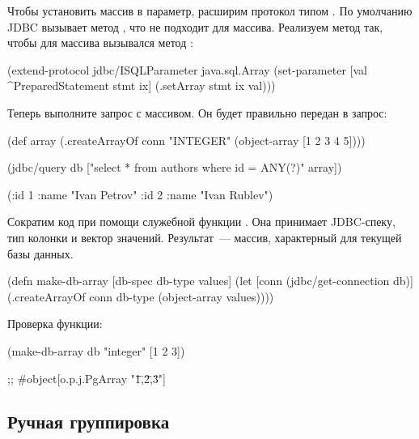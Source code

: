 Чтобы установить массив в параметр, расширим протокол  типом . По умолчанию JDBC вызывает метод , что не подходит для массива. Реализуем метод  так, чтобы для массива вызывался метод :

\begin{english}
  \begin{clojure}
(extend-protocol jdbc/ISQLParameter
  java.sql.Array
  (set-parameter [val ^PreparedStatement stmt ix]
    (.setArray stmt ix val)))
  \end{clojure}
\end{english}

Теперь выполните запрос с массивом. Он будет правильно передан в запрос:

\begin{english}
  \begin{clojure}
(def array
  (.createArrayOf conn "INTEGER"
                  (object-array [1 2 3 4 5])))

(jdbc/query db ["select * from authors
                 where id = ANY(?)" array])

({:id 1 :name "Ivan Petrov"}
 {:id 2 :name "Ivan Rublev"})
  \end{clojure}
\end{english}

Сократим код при помощи служебной функции . Она принимает JDBC-спеку, тип колонки и вектор значений. Результат~--- массив, характерный для текущей базы данных.

\begin{english}
  \begin{clojure}
(defn make-db-array [db-spec db-type values]
  (let [conn (jdbc/get-connection db)]
    (.createArrayOf conn db-type
                    (object-array values))))
  \end{clojure}
\end{english}

Проверка функции:


\begin{english}
  \begin{clojure}
(make-db-array db "integer" [1 2 3])

;; #object[o.p.j.PgArray "{\"1\",\"2\",\"3\"}"]
  \end{clojure}
\end{english}

\subsection{Ручная группировка}


